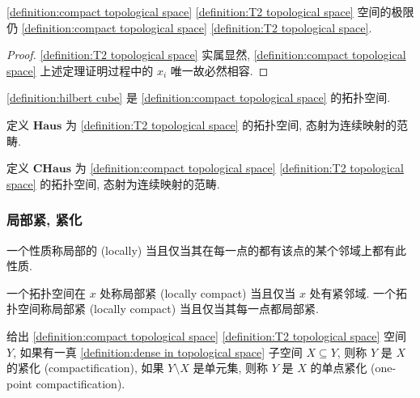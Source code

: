 \begin{corollary}
    \ref{definition:compact topological space} \ref{definition:T2 topological space} 空间的极限仍 \ref{definition:compact topological space} \ref{definition:T2 topological space}.

    \begin{proof}
        \ref{definition:T2 topological space} 实属显然, \ref{definition:compact topological space} 上述定理证明过程中的 \(x_i\) 唯一故必然相容.
    \end{proof}
\end{corollary}

\begin{corollary}
    \ref{definition:hilbert cube} 是 \ref{definition:compact topological space} 的拓扑空间.
\end{corollary}

\begin{definition}
    定义 \(\mathbf{Haus}\) 为 \ref{definition:T2 topological space} 的拓扑空间, 态射为连续映射的范畴.

    定义 \(\mathbf{CHaus}\) 为 \ref{definition:compact topological space} \ref{definition:T2 topological space} 的拓扑空间, 态射为连续映射的范畴.
\end{definition}

\subsubsection{局部紧, 紧化}

\begin{definition}[局部]
    \label {definition:locally of topological space}
    一个性质称局部的 (locally) 当且仅当其在每一点的都有该点的某个邻域上都有此性质.
\end{definition}

\begin{definition}[局部紧]
    \label {definition:locally compact topological space}
    一个拓扑空间在 \(x\) 处称局部紧 (locally compact) 当且仅当 \(x\) 处有紧邻域.
    一个拓扑空间称局部紧 (locally compact) 当且仅当其每一点都局部紧.
\end{definition}

\begin{definition}[紧化]
    \label {definition:compactification of topological space}
    \label {definition:one-point compactification of topological space}
    给出 \ref{definition:compact topological space} \ref{definition:T2 topological space} 空间 \(Y\), 如果有一真 \ref{definition:dense in topological space} 子空间 \(X \subseteq Y\),
    则称 \(Y\) 是 \(X\) 的紧化 (compactification), 如果 \(Y \setminus X\) 是单元集, 则称 \(Y\) 是 \(X\) 的单点紧化 (one-point compactification).
\end{definition}

